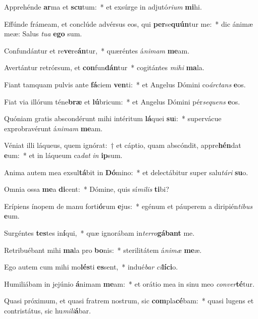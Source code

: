 \item Apprehénde \textbf{ar}ma et \textbf{scu}tum:~* et exsúrge in adjutó\textit{ri}\textit{um} \textbf{mi}hi.
\item Effúnde frámeam, et conclúde advérsus eos, qui \textbf{per}se\textbf{quún}tur me:~* dic ánimæ meæ: Salus \textit{tu}\textit{a} \textbf{e}\textbf{go} sum.
\item Confundántur et re\textbf{ve}re\textbf{án}tur,~* quæréntes á\textit{ni}\textit{mam} \textbf{me}am.
\item Avertántur retrórsum, et \textbf{con}fun\textbf{dán}tur~* cogitántes \textit{mi}\textit{hi} \textbf{ma}la.
\item Fiant tamquam pulvis ante \textbf{fá}ciem \textbf{ven}ti:~* et Angelus Dómini co\textit{árc}\textit{tans} \textbf{e}os.
\item Fiat via illórum téne\textbf{bræ} et \textbf{lú}bricum:~* et Angelus Dómini pér\textit{se}\textit{quens} \textbf{e}os.
\item Quóniam gratis abscondérunt mihi intéritum \textbf{lá}quei \textbf{su}i:~* supervácue exprobravérunt á\textit{ni}\textit{mam} \textbf{me}am.
\item Véniat illi láqueus, quem ignórat:~† et cáptio, quam abscóndit, appre\textbf{hén}dat \textbf{e}um:~* et in láqueum ca\textit{dat} \textit{in} \textbf{ip}sum.
\item Anima autem mea exsul\textbf{tá}bit in \textbf{Dó}mino:~* et delectábitur super salu\textit{tá}\textit{ri} \textbf{su}o.
\item Omnia ossa \textbf{me}a \textbf{di}cent:~* Dómine, quis sí\textit{mi}\textit{lis} \textbf{ti}bi?
\item Erípiens ínopem de manu forti\textbf{ó}rum \textbf{e}jus:~* egénum et páuperem a diripién\textit{ti}\textit{bus} \textbf{e}um.
\item Surgéntes \textbf{tes}tes in\textbf{í}qui,~* quæ ignorábam in\textit{ter}\textit{ro}\textbf{gá}\textbf{bant} me.
\item Retribuébant mihi \textbf{ma}la pro \textbf{bo}nis:~* sterilitátem á\textit{ni}\textit{mæ} \textbf{me}æ.
\item Ego autem cum mihi mo\textbf{lés}ti \textbf{es}sent,~* indué\textit{bar} \textit{ci}\textbf{lí}\textbf{ci}o.
\item Humiliábam in jejúnio \textbf{á}nimam \textbf{me}am:~* et orátio mea in sinu meo \textit{con}\textit{ver}\textbf{té}tur.
\item Quasi próximum, et quasi fratrem nostrum, sic \textbf{com}pla\textbf{cé}bam:~* quasi lugens et contristátus, sic hu\textit{mi}\textit{li}\textbf{á}bar.
